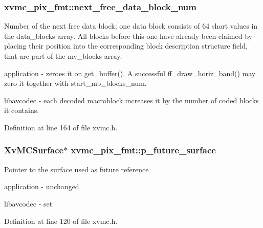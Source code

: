 \subsubsection[{\texorpdfstring{next\+\_\+free\+\_\+data\+\_\+block\+\_\+num}{next_free_data_block_num}}]{ xvmc\+\_\+pix\+\_\+fmt\+::next\+\_\+free\+\_\+data\+\_\+block\+\_\+num}\hypertarget{structxvmc__pix__fmt_af44880f97013d3b6a51705ceca7d10d7}{}\label{structxvmc__pix__fmt_af44880f97013d3b6a51705ceca7d10d7}
Number of the next free data block; one data block consists of 64 short values in the data\+\_\+blocks array. All blocks before this one have already been claimed by placing their position into the corresponding block description structure field, that are part of the mv\+\_\+blocks array.
\begin{DoxyItemize}
\item application -\/ zeroes it on get\+\_\+buffer(). A successful ff\+\_\+draw\+\_\+horiz\+\_\+band() may zero it together with start\+\_\+mb\+\_\+blocks\+\_\+num.
\item libavcodec -\/ each decoded macroblock increases it by the number of coded blocks it contains. 
\end{DoxyItemize}

Definition at line 164 of file xvmc.\+h.

\subsubsection[{\texorpdfstring{p\+\_\+future\+\_\+surface}{p_future_surface}}]{\setlength{\rightskip}{0pt plus 5cm}Xv\+M\+C\+Surface$\ast$ xvmc\+\_\+pix\+\_\+fmt\+::p\+\_\+future\+\_\+surface}\hypertarget{structxvmc__pix__fmt_ad186a2b2c6ca8c1be3ef7345ff72cb7a}{}\label{structxvmc__pix__fmt_ad186a2b2c6ca8c1be3ef7345ff72cb7a}
Pointer to the surface used as future reference
\begin{DoxyItemize}
\item application -\/ unchanged
\item libavcodec -\/ set 
\end{DoxyItemize}

Definition at line 120 of file xvmc.\+h.

